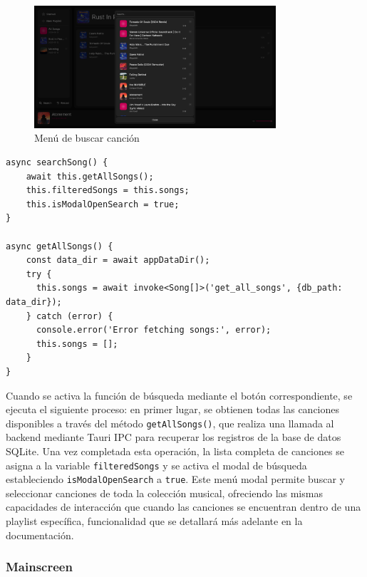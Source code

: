 \documentclass[11pt, a4paper]{article}
\begin{document}
                ‎ \\

                \begin{figure}[H]
                    \centering
                    \includegraphics[width=0.8\textwidth]{media/screenshots/search_song.png}
                    \caption{Menú de buscar canción}
                    \label{fig:buscar}
                \end{figure}

                \begin{lstlisting}[caption={searchSong()}]
async searchSong() {
    await this.getAllSongs();
    this.filteredSongs = this.songs;
    this.isModalOpenSearch = true;
}

async getAllSongs() {
    const data_dir = await appDataDir();
    try {
      this.songs = await invoke<Song[]>('get_all_songs', {db_path: data_dir});
    } catch (error) {
      console.error('Error fetching songs:', error);
      this.songs = [];
    }
}
                \end{lstlisting}

                Cuando se activa la función de búsqueda mediante el botón correspondiente, se ejecuta el siguiente proceso: en primer lugar, se obtienen todas las canciones disponibles a través del método \texttt{getAllSongs()}, que realiza una llamada al backend mediante Tauri IPC para recuperar los registros de la base de datos SQLite. Una vez completada esta operación, la lista completa de canciones se asigna a la variable \texttt{filteredSongs} y se activa el modal de búsqueda estableciendo \texttt{isModalOpenSearch} a \texttt{true}. Este menú modal permite buscar y seleccionar canciones de toda la colección musical, ofreciendo las mismas capacidades de interacción que cuando las canciones se encuentran dentro de una playlist específica, funcionalidad que se detallará más adelante en la documentación.


            \subsubsection{Mainscreen}
\end{document}
